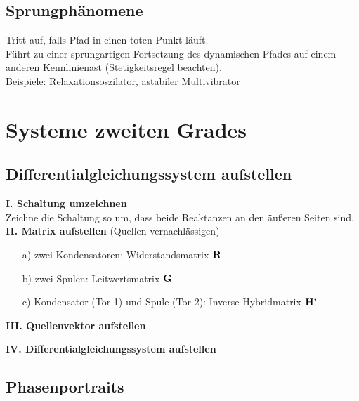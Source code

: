 \documentclass[fs, footer]{latex4ei}
\begin{document}
\begin{multicols*}{4}
\subsection{Sprungphänomene}
Tritt auf, falls Pfad in einen toten Punkt läuft.\\
Führt zu einer sprungartigen Fortsetzung des dynamischen Pfades auf einem anderen Kennlinienast (Stetigkeitsregel beachten).\\
Beispiele: Relaxationsoszilator, astabiler Multivibrator

	

\section{Systeme zweiten Grades}
	\subsection{Differentialgleichungssystem aufstellen}
		\textbf{I. Schaltung umzeichnen}\\
		Zeichne die Schaltung so um, dass beide Reaktanzen an den äußeren Seiten sind.\\
		\textbf{II. Matrix aufstellen}
		(Quellen vernachlässigen)
		\begin{itemize}
		\item[a)] zwei Kondensatoren: Widerstandsmatrix $\textbf{R}$
		\item[b)] zwei Spulen: Leitwertsmatrix $\textbf{G}$
		\item[c)] Kondensator (Tor 1) und Spule (Tor 2): Inverse Hybridmatrix $\textbf{H'}$
		\end{itemize}
		
		\textbf{III. Quellenvektor aufstellen}
		
		\textbf{IV. Differentialgleichungssystem aufstellen}
	\subsection{Phasenportraits}

\end{multicols*}
\end{document}
